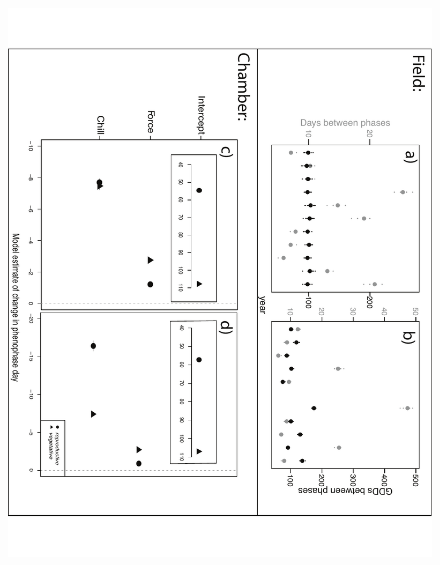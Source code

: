 \documentclass[11pt]{article}
\begin{document}
\begin{figure}[h!]
    \centering
 \includegraphics[width=\textwidth]{..//Plots/Flobuds_manuscript_figs/simulationfigure.pdf}
    \label{fig:field}
\end{figure}
\end{document}
